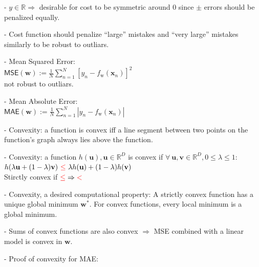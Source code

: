 - $y \in \mathbb{R} \Rightarrow$ desirable for cost to be symmetric around 0 since $\pm$ errors should be penalized equally.

- Cost function should penalize “large” mistakes and “very large” mistakes similarly to be robust to outliars.

- Mean Squared Error: \\ ${\mathsf{MSE}}(\mathbf{w}):={\frac{1}{N}}\sum_{n=1}^{N}\left[y_{n}-f_{\mathrm{w}}(\mathbf{x}_{n})\right]^{2}$ \\ not robust to outliars.

- Mean Absolute Error: \\ ${\mathsf{MAE}}(\mathbf{w}):={\frac{1}{N}}\sum_{n=1}^{N}|y_{n}-f_{\mathrm{w}}(\mathbf{x}_{n})|$

- Convexity: a function is convex iff a line segment between two points on the function’s graph always lies above the function.

- Convexity: a function $h(\mathbf{u}), \mathbf{u} \in \mathbb{R}^D$ is convex if $\forall \ \mathbf{u}, \mathbf{v} \in \mathbb{R}^D, 0 \leq \lambda \leq  1$: \\ $h(\lambda\mathbf{u}+(1-\lambda)\mathbf{v}) \ \textcolor[RGB]{255,0,0}{\leq} \ \lambda h(\mathbf{u})+(1-\lambda)h(\mathbf{v})$ \\Stirctly convex if $\textcolor[RGB]{255,0,0}{\leq} \Rightarrow \textcolor[RGB]{255,0,0}{<}$ 

- Convexity, a desired computational property:
A strictly convex function has a unique global minimum $\mathbf{w^{*}}$. For convex functions, every local minimum is a global minimum.

- Sums of convex functions are also convex $\Rightarrow$ MSE combined with a linear model is convex in $\mathbf{w}$.

- Proof of convexity for MAE:


